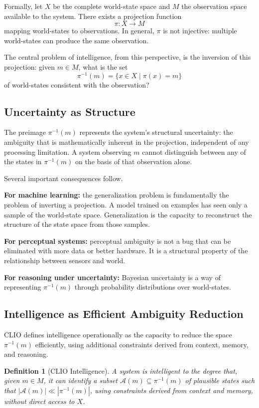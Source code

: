 \documentclass[11pt, a4paper]{article}
\theoremstyle{named}
\newtheorem{definition}{Definition}
\begin{document}
Formally, let $X$ be the complete world-state space and $M$ the
observation space available to the system. There exists a projection
function
\[
  \pi: X \to M
\]
mapping world-states to observations. In general, $\pi$ is not
injective: multiple world-states can produce the same observation.

The central problem of intelligence, from this perspective, is the
inversion of this projection: given $m \in M$, what is the set
\[
  \pi^{-1}(m) = \{x \in X \mid \pi(x) = m\}
\]
of world-states consistent with the observation?

\subsection{Uncertainty as Structure}

The preimage $\pi^{-1}(m)$ represents the system's structural
uncertainty: the ambiguity that is mathematically inherent in the
projection, independent of any processing limitation. A system
observing $m$ cannot distinguish between any of the states in
$\pi^{-1}(m)$ on the basis of that observation alone.

Several important consequences follow.

\textbf{For machine learning:} the generalization problem is
fundamentally the problem of inverting a projection. A model trained
on examples has seen only a sample of the world-state space.
Generalization is the capacity to reconstruct the structure of the
state space from those samples.

\textbf{For perceptual systems:} perceptual ambiguity is not a bug
that can be eliminated with more data or better hardware. It is a
structural property of the relationship between sensors and world.

\textbf{For reasoning under uncertainty:} Bayesian uncertainty is a
way of representing $\pi^{-1}(m)$ through probability distributions
over world-states.

\subsection{Intelligence as Efficient Ambiguity Reduction}

CLIO defines intelligence operationally as the capacity to reduce the
space $\pi^{-1}(m)$ efficiently, using additional constraints derived
from context, memory, and reasoning.

\begin{definition}[CLIO Intelligence]
A system is intelligent to the degree that, given $m \in M$, it can
identify a subset $\mathcal{A}(m) \subseteq \pi^{-1}(m)$ of plausible
states such that $|\mathcal{A}(m)| \ll |\pi^{-1}(m)|$, using
constraints derived from context and memory, without direct access
to $X$.
\end{definition}
\end{document}
